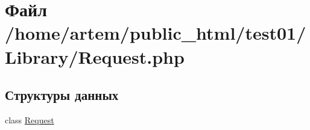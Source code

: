 \hypertarget{_request_8php}{\section{Файл /home/artem/public\-\_\-html/test01/\-Library/\-Request.php}
\label{_request_8php}
}
\subsection*{Структуры данных}
\begin{DoxyCompactItemize}
\item 
class \hyperlink{class_request}{Request}
\end{DoxyCompactItemize}
